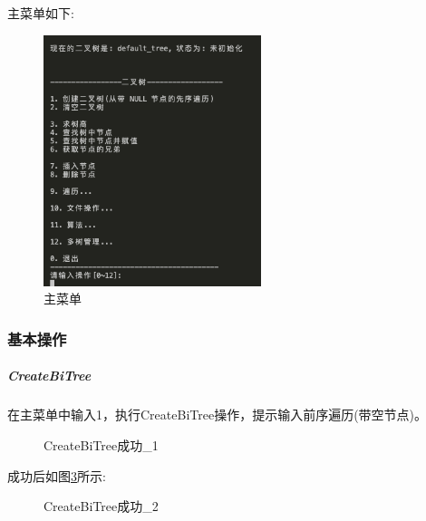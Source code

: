 \documentclass[supercite]{Experimental_Report}
\theoremstyle{definition}
\begin{document}
\noindent
主菜单如下:
\begin{figure}[htbp]
	\centering
	\includegraphics[width=2.5in]{binary_tree/menu.png}
	\caption{主菜单}
	\label{fig5-1}
\end{figure}

\clearpage
\subsubsection{基本操作}

\subparagraph{CreateBiTree}
\noindent
在主菜单中输入1，执行CreateBiTree操作，提示输入前序遍历(带空节点)。
\begin{figure}[htbp]
	\centering
	\centering
	\caption{CreateBiTree成功\_1}
	\label{fig5-2}
\end{figure}

\noindent
成功后如图\ref{fig5-3}所示:
\begin{figure}[htbp]
	\centering
	\centering
	\caption{CreateBiTree成功\_2}
	\label{fig5-3}
\end{figure}
\end{document}
